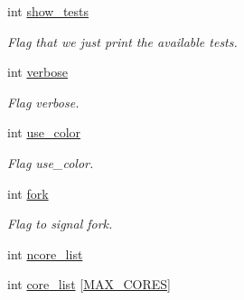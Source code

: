 \begin{DoxyCompactItemize}
\item 
int \hyperlink{structprogram__arguments_a373cc9d546fdd5ca2c75e42300caf2e6}{show\+\_\+tests}\hypertarget{structprogram__arguments_a373cc9d546fdd5ca2c75e42300caf2e6}{}\label{structprogram__arguments_a373cc9d546fdd5ca2c75e42300caf2e6}

\begin{DoxyCompactList}\small\item\em Flag that we just print the available tests. \end{DoxyCompactList}\item 
int \hyperlink{structprogram__arguments_ab075ba9c1c9d3b650c7490717ed6391e}{verbose}\hypertarget{structprogram__arguments_ab075ba9c1c9d3b650c7490717ed6391e}{}\label{structprogram__arguments_ab075ba9c1c9d3b650c7490717ed6391e}

\begin{DoxyCompactList}\small\item\em Flag verbose. \end{DoxyCompactList}\item 
int \hyperlink{structprogram__arguments_ae952a1ee415137013201280b500796c7}{use\+\_\+color}\hypertarget{structprogram__arguments_ae952a1ee415137013201280b500796c7}{}\label{structprogram__arguments_ae952a1ee415137013201280b500796c7}

\begin{DoxyCompactList}\small\item\em Flag use\+\_\+color. \end{DoxyCompactList}\item 
int \hyperlink{structprogram__arguments_ac8d013f1348ee6c7287fd974561b4f47}{fork}\hypertarget{structprogram__arguments_ac8d013f1348ee6c7287fd974561b4f47}{}\label{structprogram__arguments_ac8d013f1348ee6c7287fd974561b4f47}

\begin{DoxyCompactList}\small\item\em Flag to signal fork. \end{DoxyCompactList}\item 
int \hyperlink{structprogram__arguments_ab9717e16b92f14aa8c54dbf4a2d2b7b1}{ncore\+\_\+list}
\item 
int \hyperlink{structprogram__arguments_ad063b1ce13702392eb2a64792488d505}{core\+\_\+list} \mbox{[}\hyperlink{bios_8h_a009855593b59738d24dbfc236edb3b14}{M\+A\+X\+\_\+\+C\+O\+R\+ES}\mbox{]}\hypertarget{structprogram__arguments_ad063b1ce13702392eb2a64792488d505}{}\label{structprogram__arguments_ad063b1ce13702392eb2a64792488d505}


\end{DoxyCompactItemize}
